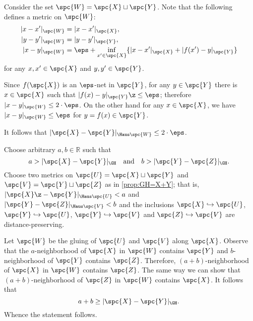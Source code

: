  Consider the set $\spc{W}=\spc{X}\sqcup \spc{Y}$.
Note that the following defines a metric on $\spc{W}$:
\begin{align*}
|x-x'|_{\spc{W}}&=|x-x'|_{\spc{X}},
\\
|y-y'|_{\spc{W}}&=|y-y'|_{\spc{Y}},
\\
|x-y|_{\spc{W}}&=\eps+\inf_{x'\in \spc{X}}\{|x-x'|_{\spc{X}}+|f(x')-y|_{\spc{Y}}\}
\end{align*}
for any $x,x'\in \spc{X}$ and $y,y'\in \spc{Y}$.

Since $f(\spc{X})$ is an $\eps$-net in $\spc{Y}$,
for any $y\in \spc{Y}$ there is $x\in \spc{X}$ such that $|f(x)-y|_{\spc{Y}}\z\le\eps$;
therefore $|x-y|_{\spc{W}}\le 2\cdot\eps$.
On the other hand for any $x\in \spc{X}$, we have $|x-y|_{\spc{W}}\le\eps$
for $y=f(x)\in \spc{Y}$.

It follows that $|\spc{X}-\spc{Y}|_{\Haus\spc{W}}\le 2\cdot\eps$.
\qedsf























Choose arbitrary $a,b \in \mathbb{R}$ such that
$$a>|\spc{X}-\spc{Y}|_{\GH}
\quad\text{and}\quad
b>|\spc{Y}-\spc{Z}|_{\GH}.$$
Choose two metrics on $\spc{U}=\spc{X}\sqcup \spc{Y}$ and $\spc{V}=\spc{Y}\sqcup \spc{Z}$ as in \ref{prop:GH=X+Y};
that is,
$|\spc{X}\z-\spc{Y}|_{\Haus\spc{U}}<a$ and $|\spc{Y}-\spc{Z}|_{\Haus\spc{V}}<b$ 
and the inclusions $\spc{X}\hookrightarrow \spc{U}$, $\spc{Y}\hookrightarrow \spc{U}$, $\spc{Y}\hookrightarrow \spc{V}$ and $\spc{Z}\hookrightarrow \spc{V}$ are distance-preserving.

Let $\spc{W}$ be the gluing of $\spc{U}$ and $\spc{V}$ along $\spc{X}$.
Observe that the $a$-neighborhood of $\spc{X}$ in $\spc{W}$ contains $\spc{Y}$ and $b$-neighborhood of $\spc{Y}$ contains $\spc{Z}$.
Therefore, $(a+b)$-neighborhood of $\spc{X}$ in $\spc{W}$ contains $\spc{Z}$.
The same way we can show that $(a+b)$-neighborhood of $\spc{Z}$ in $\spc{W}$ contains $\spc{X}$.
It follows that 
$$a+b\ge|\spc{X}-\spc{Y}|_{\GH}.$$
Whence the statement follows.
\qeds






















